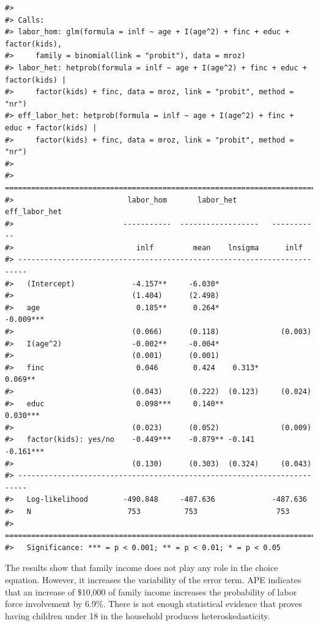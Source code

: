 \begin{verbatim}
#> 
#> Calls:
#> labor_hom: glm(formula = inlf ~ age + I(age^2) + finc + educ + factor(kids), 
#>     family = binomial(link = "probit"), data = mroz)
#> labor_het: hetprob(formula = inlf ~ age + I(age^2) + finc + educ + factor(kids) | 
#>     factor(kids) + finc, data = mroz, link = "probit", method = "nr")
#> eff_labor_het: hetprob(formula = inlf ~ age + I(age^2) + finc + educ + factor(kids) | 
#>     factor(kids) + finc, data = mroz, link = "probit", method = "nr")
#> 
#> ========================================================================
#>                          labor_hom       labor_het       eff_labor_het  
#>                         -----------  ------------------   -----------   
#>                            inlf         mean    lnsigma      inlf       
#> ------------------------------------------------------------------------
#>   (Intercept)             -4.157**     -6.030*                          
#>                           (1.404)      (2.498)                          
#>   age                      0.185**      0.264*              -0.009***   
#>                           (0.066)      (0.118)              (0.003)     
#>   I(age^2)                -0.002**     -0.004*                          
#>                           (0.001)      (0.001)                          
#>   finc                     0.046        0.424    0.313*      0.069**    
#>                           (0.043)      (0.222)  (0.123)     (0.024)     
#>   educ                     0.098***     0.140**              0.030***   
#>                           (0.023)      (0.052)              (0.009)     
#>   factor(kids): yes/no    -0.449***    -0.879** -0.141      -0.161***   
#>                           (0.130)      (0.303)  (0.324)     (0.043)     
#> ------------------------------------------------------------------------
#>   Log-likelihood        -490.848     -487.636             -487.636      
#>   N                      753          753                  753          
#> ========================================================================
#>   Significance: *** = p < 0.001; ** = p < 0.01; * = p < 0.05
\end{verbatim}

The results show that family income does not play any role in the choice equation. However, it increases the variability of the error term. APE indicates that an increase of \$10,000 of family income increases the probability of labor force involvement by 6.9\%. There is not enough statistical evidence that proves having children under 18 in the household produces heteroskedasticity.

